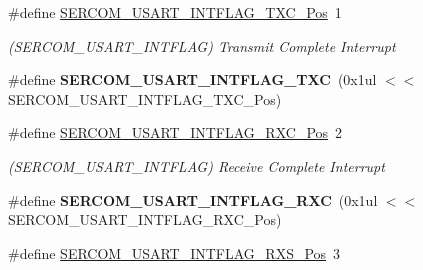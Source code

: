 \begin{DoxyCompactItemize}
\item 
\hypertarget{group___s_a_m_l21___s_e_r_c_o_m_ga1577b2bca9db2d6ff108baf036b8819f}{}\#define \hyperlink{group___s_a_m_l21___s_e_r_c_o_m_ga1577b2bca9db2d6ff108baf036b8819f}{S\+E\+R\+C\+O\+M\+\_\+\+U\+S\+A\+R\+T\+\_\+\+I\+N\+T\+F\+L\+A\+G\+\_\+\+T\+X\+C\+\_\+\+Pos}~1\label{group___s_a_m_l21___s_e_r_c_o_m_ga1577b2bca9db2d6ff108baf036b8819f}

\begin{DoxyCompactList}\small\item\em (S\+E\+R\+C\+O\+M\+\_\+\+U\+S\+A\+R\+T\+\_\+\+I\+N\+T\+F\+L\+A\+G) Transmit Complete Interrupt \end{DoxyCompactList}\item 
\hypertarget{group___s_a_m_l21___s_e_r_c_o_m_ga1c2827120b25d83c489194be9ed452c1}{}\#define {\bfseries S\+E\+R\+C\+O\+M\+\_\+\+U\+S\+A\+R\+T\+\_\+\+I\+N\+T\+F\+L\+A\+G\+\_\+\+T\+X\+C}~(0x1ul $<$$<$ S\+E\+R\+C\+O\+M\+\_\+\+U\+S\+A\+R\+T\+\_\+\+I\+N\+T\+F\+L\+A\+G\+\_\+\+T\+X\+C\+\_\+\+Pos)\label{group___s_a_m_l21___s_e_r_c_o_m_ga1c2827120b25d83c489194be9ed452c1}

\item 
\hypertarget{group___s_a_m_l21___s_e_r_c_o_m_ga7a5bf40b08a30a742a668ac3455b96c3}{}\#define \hyperlink{group___s_a_m_l21___s_e_r_c_o_m_ga7a5bf40b08a30a742a668ac3455b96c3}{S\+E\+R\+C\+O\+M\+\_\+\+U\+S\+A\+R\+T\+\_\+\+I\+N\+T\+F\+L\+A\+G\+\_\+\+R\+X\+C\+\_\+\+Pos}~2\label{group___s_a_m_l21___s_e_r_c_o_m_ga7a5bf40b08a30a742a668ac3455b96c3}

\begin{DoxyCompactList}\small\item\em (S\+E\+R\+C\+O\+M\+\_\+\+U\+S\+A\+R\+T\+\_\+\+I\+N\+T\+F\+L\+A\+G) Receive Complete Interrupt \end{DoxyCompactList}\item 
\hypertarget{group___s_a_m_l21___s_e_r_c_o_m_ga5623563d5132d6985e530df5b153cb1f}{}\#define {\bfseries S\+E\+R\+C\+O\+M\+\_\+\+U\+S\+A\+R\+T\+\_\+\+I\+N\+T\+F\+L\+A\+G\+\_\+\+R\+X\+C}~(0x1ul $<$$<$ S\+E\+R\+C\+O\+M\+\_\+\+U\+S\+A\+R\+T\+\_\+\+I\+N\+T\+F\+L\+A\+G\+\_\+\+R\+X\+C\+\_\+\+Pos)\label{group___s_a_m_l21___s_e_r_c_o_m_ga5623563d5132d6985e530df5b153cb1f}

\item 
\hypertarget{group___s_a_m_l21___s_e_r_c_o_m_ga52c1ced29469c0919453e81d3d0aa493}{}\#define \hyperlink{group___s_a_m_l21___s_e_r_c_o_m_ga52c1ced29469c0919453e81d3d0aa493}{S\+E\+R\+C\+O\+M\+\_\+\+U\+S\+A\+R\+T\+\_\+\+I\+N\+T\+F\+L\+A\+G\+\_\+\+R\+X\+S\+\_\+\+Pos}~3\label{group___s_a_m_l21___s_e_r_c_o_m_ga52c1ced29469c0919453e81d3d0aa493}


\end{DoxyCompactItemize}
